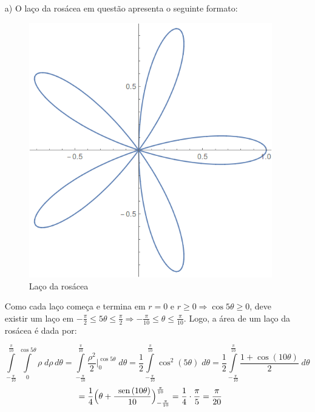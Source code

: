\documentclass[12pt,a4paper]{article}
\newcommand{\sen}{\mbox{\, sen}\,}
\begin{document}
\begin{itemize}
    \item[a)] O laço da rosácea em questão apresenta o seguinte formato:
    

\begin{figure}[H]
	\centering
	\includegraphics[scale=0.40]{Fig1a.png}  
	\caption{Laço da rosácea}
	\label{fig:figura1aB}
\end{figure}

Como cada laço começa e termina em $r=0$ e $r \geq 0 \Rightarrow \cos 5\theta \geq 0$, deve existir um laço em $-\frac{\pi}{2} \leq 5\theta \leq \frac{\pi}{2} \Rightarrow -\frac{\pi}{10} \leq \theta \leq \frac{\pi}{10}$. Logo, a área de um laço da rosácea é dada por:

$$ \int\limits_{-\frac{\pi}{10}}^{\frac{\pi}{10}} \int\limits_0^{\cos 5\theta} \rho \; d\rho \, d\theta = \int\limits_{-\frac{\pi}{10}}^{\frac{\pi}{10}} \frac{\rho^2}{2} \Big|_0^{\cos 5\theta} \; d\theta = \frac{1}{2} \int\limits_{-\frac{\pi}{10}}^{\frac{\pi}{10}} \cos^2(5\theta) \; d\theta = \frac{1}{2} \int\limits_{-\frac{\pi}{10}}^{\frac{\pi}{10}} \frac{1 + \cos (10\theta)}{2} \; d\theta $$
$$ = \frac{1}{4} \Big( \theta + \frac{\sen (10\theta)}{10} \Big)_{-\frac{\pi}{10}}^{\frac{\pi}{10}} = \frac{1}{4} \cdot \frac{\pi}{5} = \frac{\pi}{20} $$


\end{itemize}
\end{document}
